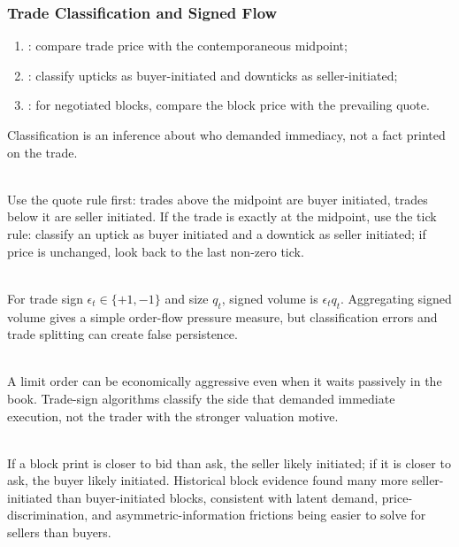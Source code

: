 \subsubsection{Trade Classification and Signed Flow}

\begin{taxonomy} 
\begin{enumerate}[label=\roman*.]
\setlength{\itemsep}{0pt}
\item {}: compare trade price with the contemporaneous midpoint;
\item {}: classify upticks as buyer-initiated and downticks as seller-initiated;
\item {}: for negotiated blocks, compare the block price with the prevailing quote.
\end{enumerate}
Classification is an inference about who demanded immediacy, not a fact printed on the trade.
\end{taxonomy}

\begin{method} \\
Use the quote rule first: trades above the midpoint are buyer initiated, trades below it are seller initiated. If the trade is exactly at the midpoint, use the tick rule: classify an uptick as buyer initiated and a downtick as seller initiated; if price is unchanged, look back to the last non-zero tick.
\end{method}

\begin{definition} \\
For trade sign $\epsilon_t\in\{+1,-1\}$ and size $q_t$, signed volume is $\epsilon_tq_t$. Aggregating signed volume gives a simple order-flow pressure measure, but classification errors and trade splitting can create false persistence.
\end{definition}

\begin{caveat} \\
A limit order can be economically aggressive even when it waits passively in the book. Trade-sign algorithms classify the side that demanded immediate execution, not the trader with the stronger valuation motive.
\end{caveat}

\begin{empiricalfinding} \\
If a block print is closer to bid than ask, the seller likely initiated; if it is closer to ask, the buyer likely initiated. Historical block evidence found many more seller-initiated than buyer-initiated blocks, consistent with latent demand, price-discrimination, and asymmetric-information frictions being easier to solve for sellers than buyers.
\end{empiricalfinding}
